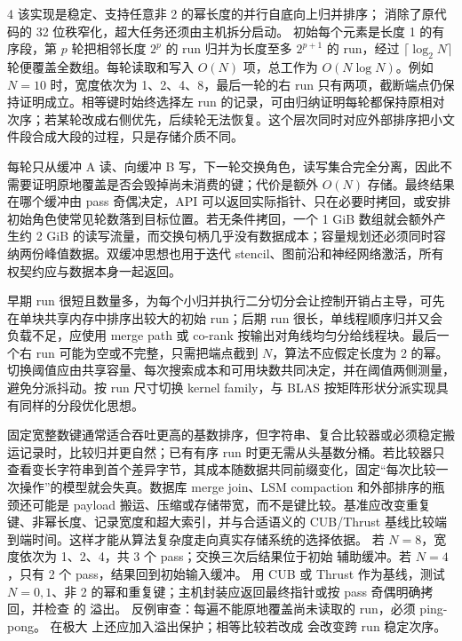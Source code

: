 \begin{solutionexercise}{4}
\conclusionheading 该实现是稳定、支持任意非 2 的幂长度的并行自底向上归并排序；
 消除了原代码的 32 位秩窄化，超大任务还须由主机拆分启动。
\discussionheading
{}初始每个元素是长度 1 的有序段，第 $p$ 轮把相邻长度 $2^p$ 的 run 归并为长度至多 $2^{p+1}$ 的 run，经过 $\lceil\log_2N\rceil$ 轮便覆盖全数组。每轮读取和写入 $O(N)$ 项，总工作为 $O(N\log N)$。例如 $N=10$ 时，宽度依次为 1、2、4、8，最后一轮的右 run 只有两项，截断端点仍保持证明成立。相等键时始终选择左 run 的记录，可由归纳证明每轮都保持原相对次序；若某轮改成右侧优先，后续轮无法恢复。这个层次同时对应外部排序把小文件段合成大段的过程，只是存储介质不同。

每轮只从缓冲 A 读、向缓冲 B 写，下一轮交换角色，读写集合完全分离，因此不需要证明原地覆盖是否会毁掉尚未消费的键；代价是额外 $O(N)$ 存储。最终结果在哪个缓冲由 pass 奇偶决定，API 可以返回实际指针、只在必要时拷回，或安排初始角色使常见轮数落到目标位置。若无条件拷回，一个 1 GiB 数组就会额外产生约 2 GiB 的读写流量，而交换句柄几乎没有数据成本；容量规划还必须同时容纳两份峰值数据。双缓冲思想也用于迭代 stencil、图前沿和神经网络激活，所有权契约应与数据本身一起返回。

早期 run 很短且数量多，为每个小归并执行二分切分会让控制开销占主导，可先在单块共享内存中排序出较大的初始 run；后期 run 很长，单线程顺序归并又会负载不足，应使用 merge path 或 co-rank 按输出对角线均匀分给线程块。最后一个右 run 可能为空或不完整，只需把端点截到 $N$，算法不应假定长度为 2 的幂。切换阈值应由共享容量、每次搜索成本和可用块数共同决定，并在阈值两侧测量，避免分派抖动。按 run 尺寸切换 kernel family，与 BLAS 按矩阵形状分派实现具有同样的分段优化思想。

固定宽整数键通常适合吞吐更高的基数排序，但字符串、复合比较器或必须稳定搬运记录时，比较归并更自然；已有有序 run 时更无需从头基数分桶。若比较器只查看变长字符串到首个差异字节，其成本随数据共同前缀变化，固定“每次比较一次操作”的模型就会失真。数据库 merge join、LSM compaction 和外部排序的瓶颈还可能是 payload 搬运、压缩或存储带宽，而不是键比较。基准应改变重复键、非幂长度、记录宽度和超大索引，并与合适语义的 CUB/Thrust 基线比较端到端时间。这样才能从算法复杂度走向真实存储系统的选择依据。
\variantheading 若 $N=8$，宽度依次为 1、2、4，共 3 个 pass；交换三次后结果位于初始
辅助缓冲。若 $N=4$，只有 2 个 pass，结果回到初始输入缓冲。
\practiceheading 用 CUB  或 Thrust  作为基线，测试
$N=0,1$、非 2 的幂和重复键；主机封装应返回最终指针或按 pass 奇偶明确拷回，并检查
 的  溢出。
反例审查：每遍不能原地覆盖尚未读取的 run，必须 ping-pong。 在极大
 上还应加入溢出保护；相等比较若改成 \code{<} 会改变跨 run 稳定次序。
\end{solutionexercise}
